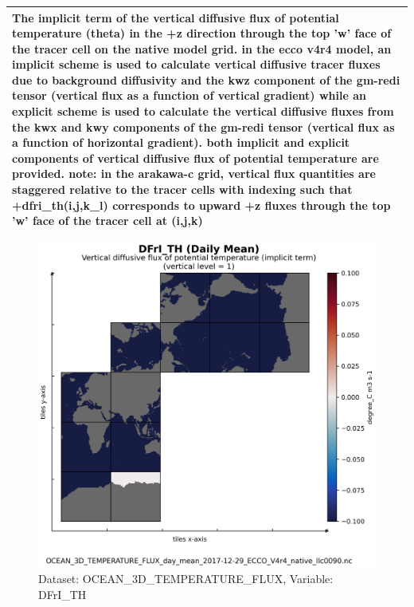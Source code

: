 \begin{longtable}{|m{}|m{}|m{}|m{}|}
\multicolumn{4}{|p{1\textwidth}|}{\footnotesize{{The implicit term of the vertical diffusive flux of potential temperature (theta) in the +z direction through the top 'w' face of the tracer cell on the native model grid. in the ecco v4r4 model, an implicit scheme is used to calculate vertical diffusive tracer fluxes due to background diffusivity and the kwz component of the gm-redi tensor (vertical flux as a function of vertical gradient) while an explicit scheme is used to calculate the vertical diffusive fluxes from the kwx and kwy components of the gm-redi tensor (vertical flux as a function of horizontal gradient). both implicit and explicit components of vertical diffusive flux of potential temperature are provided. note: in the arakawa-c grid, vertical flux quantities are staggered relative to the tracer cells with indexing such that +dfri\_th(i,j,k\_l) corresponds to upward +z fluxes through the top 'w' face of the tracer cell at (i,j,k)}}} \\ \hline
\end{longtable}

\begin{figure}[H]
\centering
\includegraphics[scale=0.55]{../images/plots/native_plots/Ocean_Three-Dimensional_Potential_Temperature_Fluxes/DFrI_TH.png}
\caption{Dataset: OCEAN\_3D\_TEMPERATURE\_FLUX, Variable: DFrI\_TH}
\label{tab:table-OCEAN_3D_TEMPERATURE_FLUX_DFrI_TH-Plot}
\end{figure}
\newpage
\pagebreak
